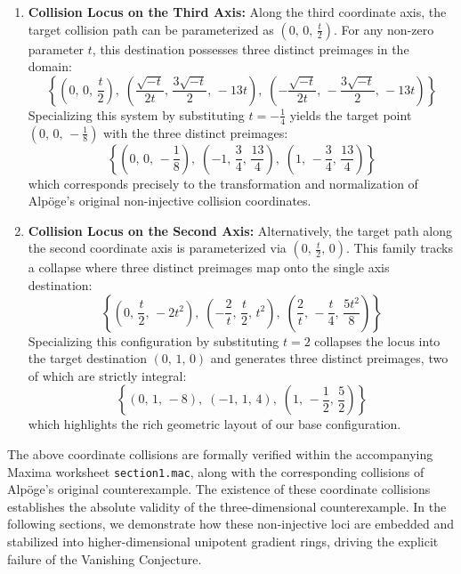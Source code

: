 \documentclass[11pt,a4paper]{article}
\begin{document}
\begin{enumerate}
    \item \textbf{Collision Locus on the Third Axis:} Along the third coordinate axis, the target collision path can be parameterized as $(0, \, 0, \, \frac{t}{2})$. For any non-zero parameter $t$, this destination possesses three distinct preimages in the domain:
    \begin{equation}
    \!\!\!\!\!\!\!\left\{ \left(0, \, 0, \, \frac{t}{2}\right), \; \left(\frac{\sqrt{-t}}{2t}, \, \frac{3\sqrt{-t}}{2}, \, -13t\right), \; \left(-\frac{\sqrt{-t}}{2t}, \, -\frac{3\sqrt{-t}}{2}, \, -13t\right) \right\}
    \end{equation}
    Specializing this system by substituting $t = -\frac{1}{4}$ yields the target point $(0, \, 0, \, -\frac{1}{8})$ with the three distinct preimages:
    \begin{equation}
    \left\{ \left(0, \, 0, \, -\frac{1}{8}\right), \; \left(-1, \, \frac{3}{4}, \, \frac{13}{4}\right), \; \left(1, \, -\frac{3}{4}, \, \frac{13}{4}\right) \right\}
    \end{equation}
    which corresponds precisely to the transformation and normalization of Alpöge's original non-injective collision coordinates.
    
    \item \textbf{Collision Locus on the Second Axis:} Alternatively, the target path along the second coordinate axis is parameterized via $(0, \, \frac{t}{2}, \, 0)$. This family tracks a collapse where three distinct preimages map onto the single axis destination:
    \begin{equation}
    \left\{ \left(0, \, \frac{t}{2}, \, -2t^2\right), \; \left(-\frac{2}{t}, \, \frac{t}{2}, \, t^2\right), \; \left(\frac{2}{t}, \, -\frac{t}{4}, \, \frac{5t^2}{8}\right) \right\}
    \end{equation}
    Specializing this configuration by substituting $t = 2$ collapses the locus into the target destination $(0, \, 1, \, 0)$ and generates three distinct preimages, two of which are strictly integral:
    \begin{equation}
    \left\{ \left(0, \, 1, \, -8\right), \; \left(-1, \, 1, \, 4\right), \; \left(1, \, -\frac{1}{2}, \, \frac{5}{2}\right) \right\}
    \end{equation}
    which highlights the rich geometric layout of our base configuration.
\end{enumerate}

The above coordinate collisions are formally verified within the accompanying Maxima worksheet \texttt{section1.mac}, along with the corresponding collisions of Alpöge's original counterexample. The existence of these coordinate collisions establishes the absolute validity of the three-dimensional counterexample. In the following sections, we demonstrate how these non-injective loci are embedded and stabilized into higher-dimensional unipotent gradient rings, driving the explicit failure of the Vanishing Conjecture.
\end{document}
